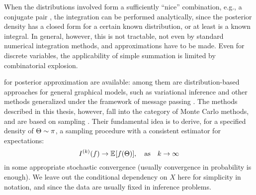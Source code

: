 When the distributions involved form a sufficiently \enquote{nice} combination, e.g., a conjugate
pair \parencites[see][chapter 2.2.2]{marin2007bayesian}[chapter
9.2.5]{murphy2012machine}, the integration can be performed analytically, since the posterior
density has a closed form for a certain known distribution, or at least is a known integral.  In
general, however, this is not tractable, not even by standard numerical integration methods, and
approximations have to be made.  Even for discrete variables, the applicability of simple summation
is limited by combinatorial explosion.

 for posterior approximation are available: among them are
distribution-based approaches for general graphical models, such as variational inference
\parencite[chapter 21 and 22]{murphy2012machine} and other methods generalized under the framework
of message passing \parencite{minka2005divergence}.  The methods described in this thesis, however,
fall into the category of Monte Carlo methods, and are based on sampling \parencites[chapter
23]{murphy2012machine}{vihola2020lectures}.  Their fundamental idea is to derive, for a specified
density of \(\Theta \sim \pi\), a sampling procedure with a consistent estimator for expectations:
\begin{equation}
  \label{eq:mc-methods}
  \kth{I}(f) \to \Exp{f(\Theta)}, \quad \text{as} \quad k
  \to \infty
\end{equation}
in some appropriate stochastic convergence (usually convergence in probability is enough).  We leave
out the conditional dependency on \(X\) here for simplicity in notation, and since the data are
usually fixed in inference problems.

